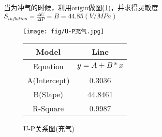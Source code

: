 \documentclass[a4paper,UTF8]{ctexart}
\begin{document}
\newpage
当为冲气的时候，利用origin做图(\ref*{fig:9})，并求得灵敏度
$S_{inflation}=\frac{\Delta U}{\Delta P}=B=44.85(V/MPa)$
\begin{figure}[!hp]
    \vspace{-10pt}
    \begin{minipage}{0.65\linewidth}
        \centering
        \texttt{[image: fig/U-P充气.jpg]}   
    \end{minipage}
    \hfill
    \begin{minipage}{0.3\linewidth}
        \begin{center}
            \begin{tabular}{c|c}
                \hline
                Model & Line\\
                \hline
                Equation & $y=A+B*x$\\
                \hline
                A(Intercept) & 0.3036\\
                \hline
                B(Slape) & 44.8461\\
                \hline
                R-Square & 0.9987\\
                \hline
            \end{tabular}
        \end{center}
    \end{minipage}
    \caption{U-P关系图(充气)}
    \label{fig:9}
\end{figure}
\end{document}

